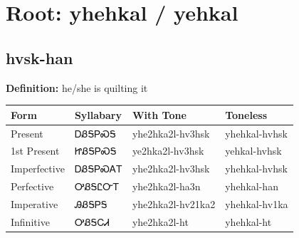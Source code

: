 \documentclass{article}%
\begin{document}
%
\normalsize%
\section*{Root: yhehkal / yehkal}%
\subsection*{hvsk-han}%
\textbf{Definition: }%
he/she is quilting it%
\\[0.5em]%
\begin{tabular}{|l|l|l|l|}%
\hline%
\textbf{Form}&\textbf{Syllabary}&\textbf{With Tone}&\textbf{Toneless}\\%
\hline%
Present&ᎠᏰᎦᏢᏍᎦ&yhe2hka2l{-}hv3hsk&yhehkal{-}hvhsk\\%
1st Present&ᏥᏰᎦᏢᏍᎦ&ye2hka2l{-}hv3hsk&yehkal{-}hvhsk\\%
Imperfective&ᎠᏰᎦᏢᏍᎪᎢ&yhe2hka2l{-}hv3hsk&yhehkal{-}hvhsk\\%
Perfective&ᎤᏰᎦᏝᏅᎢ&yhe2hka2l{-}ha3n&yhehkal{-}han\\%
Imperative&ᎯᏰᎦᏢᎦ&yhe2hka2l{-}hv21ka2&yhehkal{-}hv1ka\\%
Infinitive&ᎤᏰᎦᏟᏗ&yhe2hka2l{-}ht&yhehkal{-}ht\\%
\hline%
\end{tabular}%
\\[1em]%
\end{document}
